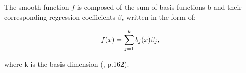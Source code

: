 The smooth function $f$ is composed of the sum of basis functions b and their corresponding regression coefficients $\beta$, written in the form of:

\begin{equation}  \label{eq:4.2} 
f(x) = \sum\limits_{j=1}^k b_{j}(x) \beta_{j}, \\
\end{equation}

where k is the basis dimension (\citet{Wood_2017}, p.162). 






